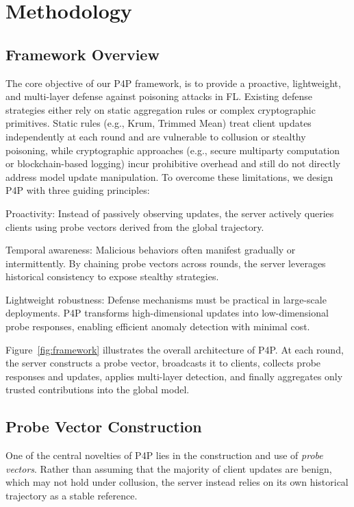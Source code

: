 \section{Methodology} \label{sect:methodology}

\subsection{Framework Overview}
The core objective of our P4P framework, is to provide a proactive, lightweight, and multi-layer defense against poisoning attacks in FL. 
Existing defense strategies either rely on static aggregation rules or complex cryptographic primitives. 
Static rules (e.g., Krum, Trimmed Mean) treat client updates independently at each round and are vulnerable to collusion or stealthy poisoning, while cryptographic approaches (e.g., secure multiparty computation or blockchain-based logging) incur prohibitive overhead and still do not directly address model update manipulation. 
To overcome these limitations, we design P4P with three guiding principles: 


Proactivity: Instead of passively observing updates, the server actively queries clients using probe vectors derived from the global trajectory. 

Temporal awareness: Malicious behaviors often manifest gradually or intermittently. By chaining probe vectors across rounds, the server leverages historical consistency to expose stealthy strategies.

Lightweight robustness: Defense mechanisms must be practical in large-scale deployments. P4P transforms high-dimensional updates into low-dimensional probe responses, enabling efficient anomaly detection with minimal cost.


Figure~\ref{fig:framework} illustrates the overall architecture of P4P. At each round, the server constructs a probe vector, broadcasts it to clients, collects probe responses and updates, applies multi-layer detection, and finally aggregates only trusted contributions into the global model. 

\subsection{Probe Vector Construction}

One of the central novelties of P4P lies in the construction and use of \textit{probe vectors}. 
Rather than assuming that the majority of client updates are benign, which may not hold under collusion, the server instead relies on its own historical trajectory as a stable reference. 

